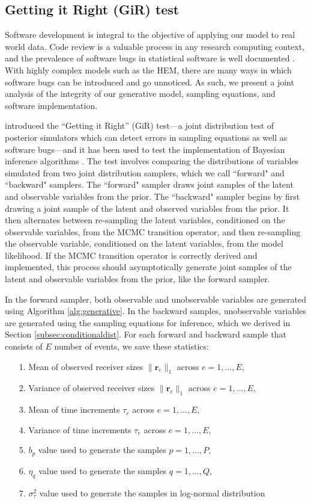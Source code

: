 \documentclass[ba]{imsart}
\numberwithin{equation}{section}
\theoremstyle{plain}
\begin{document}
	\subsection{Getting it Right (GiR) test} \label{subec:GiR}
	Software development is integral to the objective of applying our model to real world data. Code review is a valuable process in any research computing context, and the prevalence of software bugs in statistical software is well documented \citep[e.g., ][]{altman2004numerical,mccullough2009accuracy}.  With highly complex models such as the HEM, there are many ways in which software bugs can be introduced and go unnoticed. As such, we present a joint analysis of the integrity of our generative model, sampling equations, and software implementation. 
	
	\cite{geweke2004getting} introduced the ``Getting it Right'' (GiR) test---a joint distribution test of posterior simulators which can detect errors in sampling equations as well as software bugs---and it has been used to test the implementation of Bayesian inference algorithms \citep{zhao2016bayesian}.  The test involves comparing the distributions of variables simulated from two joint distribution samplers, which we call ``forward" and ``backward" samplers. The ``forward" sampler draws joint samples of the latent and observable variables from the prior. The ``backward" sampler begins by first drawing a joint sample of the latent and observed variables from the prior. It then alternates between re-sampling the latent variables, conditioned on the observable variables, from the MCMC transition operator, and then re-sampling the observable variable, conditioned on the latent variables, from the model likelihood. If the MCMC transition operator is correctly derived and implemented, this process should asymptotically generate joint samples of the latent and observable variables from the prior, like the forward sampler.
		
	In the forward sampler, both observable and unobservable variables are generated using Algorithm \ref{alg:generative}. In the backward samples, unobservable variables are generated using the sampling equations for inference, which we derived in Section \ref{subsec:conditionaldist}. For each forward and backward sample that consists of $E$ number of events, we save these statistics:
	\begin{itemize}
		\item[1.] Mean of observed receiver sizes $ \lVert \boldsymbol{r}_{e} \rVert_1 $ across $e=1,\ldots,E$,
		\item[2.] Variance of observed receiver sizes $ \lVert \boldsymbol{r}_{e} \rVert_1 $ across $e=1,\ldots,E$,
		\item[3.] Mean of time increments $\tau_e$ across $e=1,...,E$,
		\item[4.] Variance of time increments $\tau_e$ across $e=1,...,E$,
		\item[5.] $b_p$ value used to generate the samples $p = 1,...,P$,
		\item[6.] $\eta_q$ value used to generate the samples $q = 1,...,Q$,
		\item[7.] $\sigma^2_\tau$ value used to generate the samples in log-normal distribution
	\end{itemize}
\end{document}
